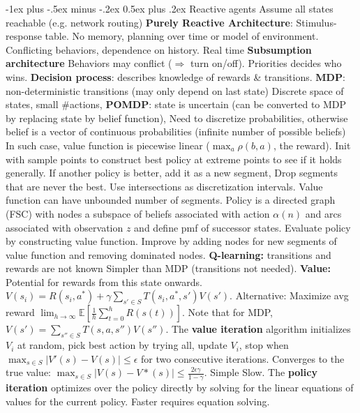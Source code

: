 \documentclass{article}
\makeatletter
\renewcommand{\section}{\@startsection{section}{1}{0mm}%
                                {-1ex plus -.5ex minus -.2ex}%
                                {0.5ex plus .2ex}%
                                {\color{blue}\normalfont\footnotesize\bfseries}}
\newcommand{\disadv}[1]{{\color{red} #1}}
\newcommand{\adv}[1]{{\color{green!60!blue} #1}}
\makeatother
\begin{document}
\fontsize{4pt}{5pt}\selectfont

\begin{multicols*}{4}
\setlength{\premulticols}{1pt}
\setlength{\postmulticols}{1pt}
\setlength{\multicolsep}{1pt}
\setlength{\columnsep}{2pt}

\section{Reactive agents}
\disadv{Assume all states reachable (e.g. network routing)}
\textbf{Purely Reactive Architecture}: Stimulus-response table. \disadv{No memory, planning over time or model of environment. Conflicting behaviors, dependence on history}. \adv{Real time}
\textbf{Subsumption architecture} Behaviors may conflict ($\Rightarrow$ turn on/off). Priorities decides who wins.
\textbf{Decision process}: describes knowledge of rewards \& transitions. \textbf{MDP}: non-deterministic transitions (may only depend on last state) \disadv{Discrete space of states, small \#actions}, \textbf{POMDP}: state is uncertain (can be converted to MDP by replacing state by belief function), \disadv{Need to discretize probabilities, otherwise belief is a vector of continuous probabilities (infinite number of possible beliefs)} In such case, value function is piecewise linear ($\max_a \rho (b,a)$, the reward). Init with sample points to construct best policy at extreme points to see if it holds generally. If another policy is better, add it as a new segment, Drop segments that are never the best. Use intersections as discretization intervals. \disadv{Value function can have unbounded number of segments}. Policy is a directed graph (FSC) with nodes a subspace of beliefs associated with action $\alpha(n)$ and arcs associated with observation $z$ and define pmf of successor states. Evaluate policy by constructing value function. Improve by adding nodes for new segments of value function and removing dominated nodes. \textbf{Q-learning:} transitions and rewards are not known \adv{Simpler than MDP (transitions not needed)}.
\textbf{Value:} Potential for rewards from this state onwards. $V(s_i) = R(s_i, a^*) + \gamma \sum_{s'\in S} T(s_i, a^*, s')V(s')$. Alternative: Maximize avg reward $\lim_{h\to\infty}\mathbb{E}[\frac{1}{h}\sum_{t=0}^h R(s(t))]$. Note that for MDP, $V(s')=\sum_{s''\in S}T(s,a,s'')V(s'')$.
The \textbf{value iteration} algorithm initializes $V_i$ at random, pick best action by trying all, update $V_i$, stop when $\max_{s\in S}|V'(s)-V(s)|\leq \epsilon$ for two consecutive iterations. \adv{Converges to the true value:} $\max_{s\in S}|V(s)-V*(s)|\leq \frac{2\epsilon \gamma}{1 -\gamma}$. \adv{Simple} \disadv{Slow}.
The \textbf{policy iteration} optimizes over the policy directly by solving for the linear equations of values for the current policy. \adv{Faster} \disadv{requires equation solving}.


\end{multicols*}
\end{document}
